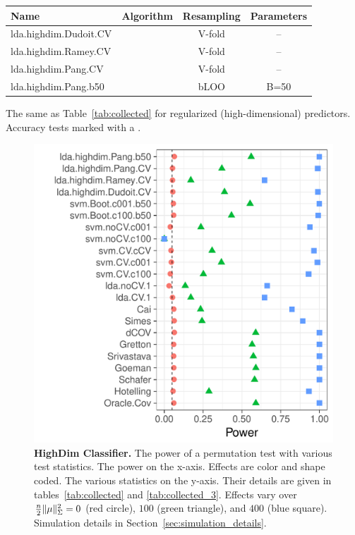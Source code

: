 \documentclass[]{bio}
\begin{document}
\bigskip

\begin{tcolorbox}
	\centering
	\footnotesize
	\begin{tabular}{l|c|c|c}
		Name & Algorithm & Resampling &  Parameters\\ 
		\hline
		\hline
		\cue lda.highdim.Dudoit.CV & \cite{dudoit_comparison_2002} & V-fold & -- \\ 
		\cue lda.highdim.Ramey.CV & \cite{ramey_high-dimensional_2016} & V-fold & -- \\ 
		\cue lda.highdim.Pang.CV & \cite{pang_shrinkage-based_2009} & V-fold & -- \\ 
		\cue lda.highdim.Pang.b50 & \cite{pang_shrinkage-based_2009} & bLOO 	 & B=50 \\ 
	\end{tabular} 
	\captionsetup{type=table}
	\caption{\footnotesize
		The same as Table~\ref{tab:collected} for regularized (high-dimensional) predictors. 
		Accuracy tests marked with a \cue.
	} 
	\label{tab:collected_3}
\end{tcolorbox}


\begin{figure}[ht]
	\centering
	\includegraphics[width=0.5\columnwidth]{"art/file14"}
	\caption{
		\textbf{HighDim Classifier.} 
		The power of a permutation test with various test statistics. 
		The power on the x-axis. 
		Effects are color and shape coded. 
		The various statistics on the y-axis. 
		Their details are given in tables~\ref{tab:collected} and \ref{tab:collected_3}. 
		Effects vary over $\frac{n}{2}\Vert \mu \Vert^2_\Sigma=0$ (red circle), $100$ (green triangle), and $400$ (blue square). 
		Simulation details in Section~\ref{sec:simulation_details}.
	} 
	\label{fig:highdim}
\end{figure}
\end{document}

